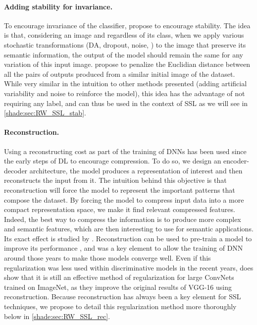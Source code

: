 \paragraph{Adding stability for invariance.} To encourage invariance of the classifier, \citet{Sajjadi2016} propose to encourage stability. The idea is that, considering an image and regardless of its class, when we apply various stochastic transformations (\ac{DA}, dropout, noise, \etc) to the image that preserve its semantic information, the output of the model should remain the same for any variation of this input image. \citet{Sajjadi2016} propose to penalize the Euclidian distance between all the pairs of outputs produced from a similar initial image of the dataset. While very similar in the intuition to other methods presented (adding artificial variability and noise to reinforce the model), this idea has the advantage of not requiring any label, and can thus be used in the context of \ac{SSL} as we will see in \autoref{shade:sec:RW_SSL_stab}.

\paragraph{Reconstruction.} Using a reconstructing cost as part of the training of \acp{DNN} has been used since the early steps of \ac{DL} \citep{HintonSalakhutdinov2006b} to encourage compression. To do so, we design an encoder-decoder architecture, \ie the model produces a representation of interest and then reconstructs the input from it. The intuition behind this objective is that reconstruction will force the model to represent the important patterns that compose the dataset. By forcing the model to compress input data into a more compact representation space, we make it find relevant compressed features. Indeed, the best way to compress the information is to produce more complex and semantic features, which are then interesting to use for semantic applications. Its exact effect is studied by \citet{erhan2010does}. Reconstruction can be used to pre-train a model to improve its performance \citep{bengio2007greedy}, and was a key element to allow the training of \ac{DNN} around those years to make those models converge well.
Even if this regularization was less used within discriminative models in the recent years, \citet{Zhang2016a} does show that it is still an effective method of regularization for large \acp{ConvNet} trained on ImageNet, as they improve the original results of VGG-16 \citep{simonyan2015very} using reconstruction.
Because reconstruction has always been a key element for \acf{SSL} techniques, we propose to detail this regularization method more thoroughly below in \autoref{shade:sec:RW_SSL_rec}.

